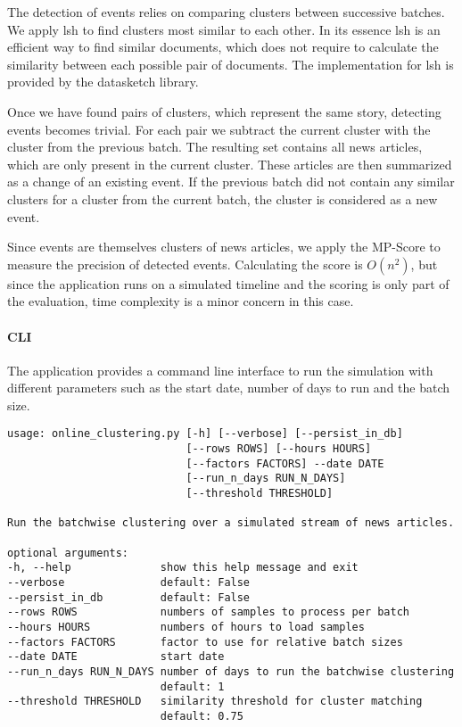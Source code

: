 The detection of events relies on comparing clusters between successive batches. 
We apply \gls{lsh}\cite{alex2015practical} to find clusters most similar to each other.
In its essence \gls{lsh} is an efficient way to find similar documents, 
which does not require to calculate the similarity between each possible pair of documents. 
The implementation for \gls{lsh} is provided by the datasketch library\cite{eric_zhu_2017_290602}.

Once we have found pairs of clusters, which represent the same story, detecting events becomes trivial.
For each pair we subtract the current cluster with the cluster from the previous batch. 
The resulting set contains all news articles, which are only present in the current cluster.
These articles are then summarized as a change of an existing event. 
If the previous batch did not contain any similar clusters for a cluster from the current batch, 
the cluster is considered as a new event.

Since events are themselves clusters of news articles,
we apply the MP-Score to measure the precision of detected events. 
Calculating the score is $O(n^2)$, but since the application runs on a simulated timeline and the scoring is only part of the evaluation,
time complexity is a minor concern in this case.

\paragraph{CLI}
The application provides a command line interface to run the simulation with different parameters
such as the start date, number of days to run and the batch size.

\begin{lstlisting}[caption=Command line interface for the online clustering, label={lst:cli_online_clustering}]
usage: online_clustering.py [-h] [--verbose] [--persist_in_db] 
                            [--rows ROWS] [--hours HOURS] 
                            [--factors FACTORS] --date DATE
                            [--run_n_days RUN_N_DAYS] 
                            [--threshold THRESHOLD]

Run the batchwise clustering over a simulated stream of news articles.

optional arguments:
-h, --help              show this help message and exit
--verbose               default: False
--persist_in_db         default: False
--rows ROWS             numbers of samples to process per batch
--hours HOURS           numbers of hours to load samples
--factors FACTORS       factor to use for relative batch sizes
--date DATE             start date
--run_n_days RUN_N_DAYS number of days to run the batchwise clustering
                        default: 1
--threshold THRESHOLD   similarity threshold for cluster matching
                        default: 0.75

\end{lstlisting}
